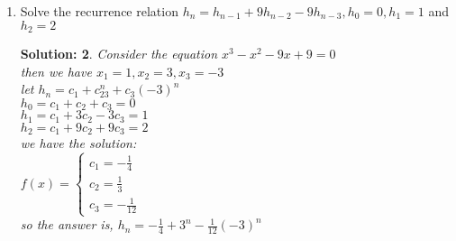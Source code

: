 \documentclass{article}
\theoremstyle{break}
\newtheorem*{solution*}{\textbf{Solution:} }
\begin{document}
\begin{enumerate}
\begin{solution*}
                By \textbf{Wolfram Alpha}, we have $r = 8 $
        \end{solution*}
        \vspace{10mm}
        \item Solve the recurrence relation $h_n=h_{n−1}+ 9h_{n−2}−9h_{n−3},h_0= 0, h_1= 1$ and $h_2= 2$
        \begin{solution*}
                Consider the equation $x^3 - x^2 - 9x + 9 = 0$\\
                then we have $x_1=1 , x_2=3, x_3 = -3$\\
                let $h_n = c_1 + c_23^n + c_3(-3)^n$\\
                $h_0 = c_1 + c_2 + c_3 = 0$\\
                $h_1 = c_1 + 3c_2 - 3c_3 = 1$\\
                $h_2 = c_1 + 9c_2 + 9c_3= 2$\\
                we have the solution:\\
                $ f(x)=\left\{
                \begin{aligned}
                c_1 = - \frac14\\
                c_2 = \frac13 \\
                c_3 = -\frac{1}{12}
                \end{aligned}
                \right.
                $\\
                so the answer is, $h_n = -\frac14 + 3^{n} - \frac{1}{12}(-3)^n $
                        
                       


\end{solution*}
\end{enumerate}
\end{document}

